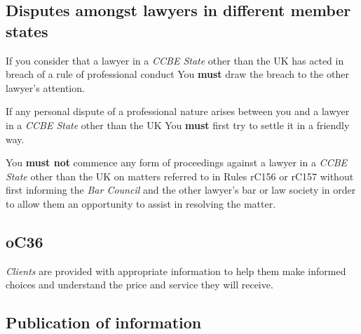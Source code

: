\subsection{Disputes amongst lawyers in different member states}


If you consider that a lawyer in a \emph{CCBE State} other than the UK
has acted in breach of a rule of professional conduct You \textcolor{myred}{\textbf{must}} draw the
breach to the other lawyer's attention.


If any personal dispute of a professional nature arises between you and
a lawyer in a \emph{CCBE State} other than the UK You \textcolor{myred}{\textbf{must}} first try to
settle it in a friendly way.


You \textcolor{myred}{\textbf{must not}} commence any form of proceedings against a lawyer in a
\emph{CCBE State} other than the UK on matters referred to in Rules
rC156 or rC157 without first informing the \emph{Bar Council} and the
other lawyer's bar or law society in order to allow them an opportunity
to assist in resolving the matter.






\subsection{\color{bleu}oC36}

\emph{Clients} are provided with appropriate information to help them
make informed choices and understand the price and service they will
receive.



\subsection{Publication of information}


